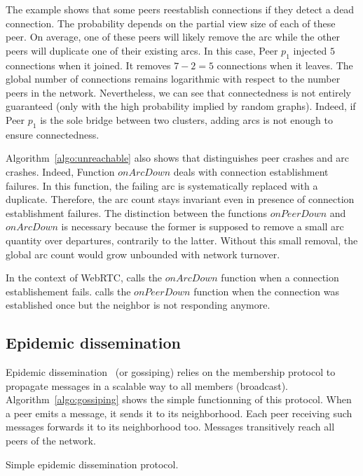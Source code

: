 The example shows that some peers reestablish connections if they
detect a dead connection. The probability depends on the partial view
size of each of these peer. On average, one of these peers will likely
remove the arc while the other peers will duplicate one of their
existing arcs. In this case, Peer $p_1$ injected $5$ connections when
it joined. It removes $7-2 =5 $ connections when it leaves. The global
number of connections remains logarithmic with respect to the number
peers in the network. Nevertheless, we can see that connectedness is
not entirely guaranteed (only with the high probability implied by
random graphs). Indeed, if Peer $p_1$ is the sole bridge between two
clusters, adding arcs is not enough to ensure connectedness.

Algorithm~\ref{algo:unreachable} also shows that \SPRAY distinguishes peer
crashes and arc crashes. Indeed, Function $onArcDown$ deals with connection
establishment failures. In this function, the failing arc is systematically
replaced with a duplicate. Therefore, the arc count stays invariant even in
presence of connection establishment failures. The distinction between the
functions $onPeerDown$ and $onArcDown$ is necessary because the former is
supposed to remove a small arc quantity over departures, contrarily to the
latter. Without this small removal, the global arc count would grow unbounded
with network turnover.

In the context of WebRTC, \SPRAY calls the $onArcDown$ function when a connection
establishement fails. \SPRAY calls the $onPeerDown$ function when the
connection was established once but the neighbor is not responding anymore.

\subsection{Epidemic dissemination}
\label{subsec:gossiping}

Epidemic dissemination~\cite{birman1999bimodal,demers1987epidemic} (or
gossiping) relies on the membership protocol to propagate messages in a scalable
way to all members (broadcast). Algorithm~\ref{algo:gossiping} shows the simple
functionning of this protocol. When a peer emits a message, it sends it to its
neighborhood. Each peer receiving such messages forwards it to its neighborhood
too. Messages transitively reach all peers of the network.

\begin{algorithm}[h]
  
  \caption{\label{algo:gossiping}Simple epidemic dissemination protocol.}
\end{algorithm}

